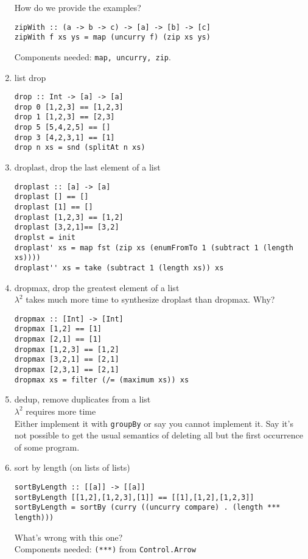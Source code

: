 \begin{enumerate}
	How do we provide the examples?
	\begin{lstlisting}
zipWith :: (a -> b -> c) -> [a] -> [b] -> [c]
zipWith f xs ys = map (uncurry f) (zip xs ys)
	\end{lstlisting}
	Components needed: \lstinline?map, uncurry, zip?.
%
	\item list drop
	\begin{lstlisting}
drop :: Int -> [a] -> [a]
drop 0 [1,2,3] == [1,2,3]
drop 1 [1,2,3] == [2,3]
drop 5 [5,4,2,5] == []
drop 3 [4,2,3,1] == [1]
drop n xs = snd (splitAt n xs)
	\end{lstlisting}
%
	\item droplast, drop the last element of a list
	\begin{lstlisting}
droplast :: [a] -> [a]
droplast [] == []
droplast [1] == []
droplast [1,2,3] == [1,2]
droplast [3,2,1]== [3,2]
droplst = init
droplast' xs = map fst (zip xs (enumFromTo 1 (subtract 1 (length xs))))
droplast'' xs = take (subtract 1 (length xs)) xs
	\end{lstlisting}
%
	\item dropmax, drop the greatest element of a list\\
	$\lambda^2$ takes much more time to synthesize droplast than dropmax. Why?
	\begin{lstlisting}
dropmax :: [Int] -> [Int]
dropmax [1,2] == [1]
dropmax [2,1] == [1]
dropmax [1,2,3] == [1,2]
dropmax [3,2,1] == [2,1]
dropmax [2,3,1] == [2,1]
dropmax xs = filter (/= (maximum xs)) xs
	\end{lstlisting}
%
	\item dedup, remove duplicates from a list \\
	$\lambda^2$ requires more time\\
	 Either implement it with \lstinline?groupBy? or say you cannot implement it. Say it's not possible to get the usual semantics of deleting all but the first occurrence of some program.
%
	\item sort by length (on lists of lists)
	\begin{lstlisting}
sortByLength :: [[a]] -> [[a]]
sortByLength [[1,2],[1,2,3],[1]] == [[1],[1,2],[1,2,3]]
sortByLength = sortBy (curry ((uncurry compare) . (length *** length)))
	\end{lstlisting}
	 What's wrong with this one? \\
	Components needed: \lstinline?(***)? from \lstinline?Control.Arrow?

\end{enumerate}
